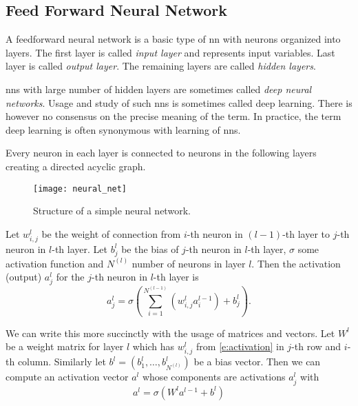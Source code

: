 \subsection{Feed Forward Neural Network}\label{s:feed-forward}

A feedforward neural network is a basic type of \gls{nn} with neurons organized into layers. The first layer is called \textit{input layer} and represents input variables. Last layer is called \textit{output layer}. The remaining layers are called \textit{hidden layers}. 

\glspl{nn} with large number of hidden layers are sometimes called \textit{deep neural networks}. Usage and study of such \glspl{nn} is sometimes called deep learning. There is however no consensus on the precise meaning of the term. In practice, the term deep learning is often synonymous with learning of \glspl{nn}.

Every neuron in each layer is connected to neurons in the following layers creating a directed acyclic graph. 

\begin{figure}[ht]
\centering
\texttt{[image: neural\_net]}
\caption[Structure of a simple neural network.]{Structure of a simple neural network.\cite{cs231n}}
\label{fig:nn1}
\end{figure}

Let $w^l_{i,j}$ be the weight of connection from $i$-th neuron in $(l - 1)$-th layer to $j$-th neuron in $l$-th layer. Let $b_j^l$ be the bias of $j$-th neuron in $l$-th layer, $\sigma$ some activation function and $N^{(l)}$ number of neurons in layer $l$. Then the activation (output) $a_j^l$ for the $j$-th neuron in $l$-th layer is
\begin{equation}
    \label{e:activation}
    a^l_j = \sigma \left( \sum_{i=1}^{N^{(l-1)}} (w_{i,j}^l a^{l-1}_i) + b_j^l \right).
\end{equation}

We can write this more succinctly with the usage of matrices and vectors. Let $W^l$ be a weight matrix for layer $l$ which has $w^l_{i,j}$ from \autoref{e:activation} in $j$-th row and $i$-th column. Similarly let $b^l = (b_1^l, \dots{}, b_{N^{(l)}}^l)$ be a bias vector. Then we can compute an activation vector $a^l$ whose components are activations $a_j^l$ with
\begin{equation}
    \label{e:layerActivation}
    a^l = \sigma\left( W^la^{l-1} + b^l \right)
\end{equation}

